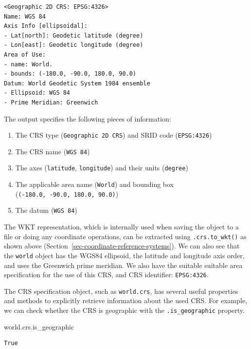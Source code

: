 \documentclass[
  letterpaper,
]{krantz}
\newenvironment{Shaded}{\begin{snugshade}}{\end{snugshade}}
\newcommand{\NormalTok}[1]{\textcolor[rgb]{0.00,0.23,0.31}{#1}}
\providecommand{\tightlist}{%
  \setlength{\itemsep}{0pt}\setlength{\parskip}{0pt}}\usepackage{longtable,booktabs,array}
\begin{document}
\begin{verbatim}
<Geographic 2D CRS: EPSG:4326>
Name: WGS 84
Axis Info [ellipsoidal]:
- Lat[north]: Geodetic latitude (degree)
- Lon[east]: Geodetic longitude (degree)
Area of Use:
- name: World.
- bounds: (-180.0, -90.0, 180.0, 90.0)
Datum: World Geodetic System 1984 ensemble
- Ellipsoid: WGS 84
- Prime Meridian: Greenwich
\end{verbatim}

The output specifies the following pieces of information:

\begin{enumerate}
\def\labelenumi{\arabic{enumi}.}
\tightlist
\item
  The CRS type (\texttt{Geographic\ 2D\ CRS}) and SRID code
  (\texttt{EPSG:4326})
\item
  The CRS name (\texttt{WGS\ 84})
\item
  The axes (\texttt{latitude}, \texttt{longitude}) and their units
  (\texttt{degree})
\item
  The applicable area name (\texttt{World}) and bounding box
  (\texttt{(-180.0,\ -90.0,\ 180.0,\ 90.0)})
\item
  The datum (\texttt{WGS\ 84})
\end{enumerate}

The WKT representation, which is internally used when saving the object
to a file or doing any coordinate operations, can be extracted using
\texttt{.crs.to\_wkt()} as shown above
(Section~\ref{sec-coordinate-reference-systems}). We can also see that
the \texttt{world} object has the WGS84 ellipsoid, the latitude and
longitude axis order, and uses the Greenwich prime meridian. We also
have the suitable suitable area specification for the use of this CRS,
and CRS identifier: \texttt{EPSG:4326}.

The CRS specification object, such as \texttt{world.crs}, has several
useful properties and methods to explicitly retrieve information about
the used CRS. For example, we can check whether the CRS is geographic
with the \texttt{.is\_geographic} property.

\begin{Shaded}
\begin{Highlighting}[]
\NormalTok{world.crs.is\_geographic}
\end{Highlighting}
\end{Shaded}

\begin{verbatim}
True
\end{verbatim}
\end{document}
